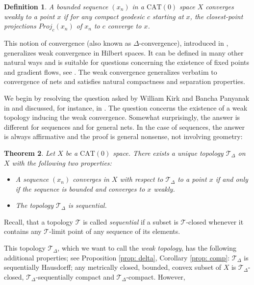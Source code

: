 \documentclass[12pt,leqno]{amsart}
\numberwithin{equation}{section}
\newtheorem{thm}{Theorem}[section]
\newtheorem{defn}[thm]{Definition}
\theoremstyle{remark}
\newcommand{\CAT}{\mathrm{CAT}}
\begin{document}
\begin{defn}
A bounded sequence $(x_n)$ in a $\CAT(0)$ space $X$ \emph{converges weakly} to a point $x$ if for any compact geodesic $c$ starting at $x$, the closest-point projections $Proj _c (x_n)$ of $x_n$ to $c$ converge to $x$. 
\end{defn}

This notion of convergence (also known as $\Delta$-convergence), introduced in \cite{Jost}, generalizes weak convergence in Hilbert spaces. It can be defined in many other natural ways and is suitable for questions concerning the existence of fixed points and gradient flows, see \cite{Bac}. The weak convergence generalizes verbatim to convergence of nets and satisfies natural compactness and separation properties.

We begin by resolving the question asked by William Kirk and Bancha Panyanak in \cite[Question 1]{Kirk} and discussed, for instance, in \cite{Bac4,Bac,Kell,Obs}.
The question concerns the existence of a weak topology inducing the weak convergence.
Somewhat surprisingly, the answer is different for sequences and for general nets.
In the case of sequences, the answer is always affirmative and the proof is general nonsense, not involving geometry:

\begin{thm} \label{thm1}
Let $X$ be a $\CAT(0)$ space. There exists a unique topology $\mathcal T_{\Delta }$ on $X$ with the following two properties:
\begin{itemize}

\item 	A sequence $(x_n)$ converges in $X$ with respect to $\mathcal T_{\Delta}$ to a point $x$ if and only if the sequence is bounded and converges to $x$ weakly. 

\item The topology $\mathcal T_{\Delta }$ is sequential.

\end{itemize}
\end{thm}

Recall, that a topology $\mathcal T$ is called \emph{sequential} if a subset is $\mathcal T$-closed whenever it contains any $\mathcal T$-limit point of any sequence of its elements. 

This topology $\mathcal T_{\Delta}$, which we want to call the \emph{weak topology}, has the following additional properties;
see Proposition \ref{prop: delta}, Corollary \ref{prop: comp}: 
$\mathcal T _{\Delta}$ is sequentially Hausdorff; any metrically closed, bounded,  convex subset of $X$ is $\mathcal T_{\Delta}$-closed, 
	$\mathcal T_{\Delta}$-sequentially compact and $\mathcal T_{\Delta}$-compact. However,
\end{document}
